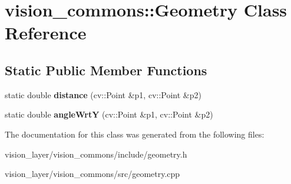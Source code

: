 \hypertarget{classvision__commons_1_1Geometry}{}\section{vision\+\_\+commons\+:\+:Geometry Class Reference}
\label{classvision__commons_1_1Geometry}
\subsection*{Static Public Member Functions}
\begin{DoxyCompactItemize}
\item 
\mbox{\label{classvision__commons_1_1Geometry_aa3787f4923df9b302c4ddc780fa357cc}} 
static double {\bfseries distance} (cv\+::\+Point \&p1, cv\+::\+Point \&p2)
\item 
\mbox{\label{classvision__commons_1_1Geometry_a1576d1ef96bf4e57a8e132715c8be2bd}} 
static double {\bfseries angle\+WrtY} (cv\+::\+Point \&p1, cv\+::\+Point \&p2)
\end{DoxyCompactItemize}


The documentation for this class was generated from the following files\+:\begin{DoxyCompactItemize}
\item 
vision\+\_\+layer/vision\+\_\+commons/include/geometry.\+h\item 
vision\+\_\+layer/vision\+\_\+commons/src/geometry.\+cpp\end{DoxyCompactItemize}
